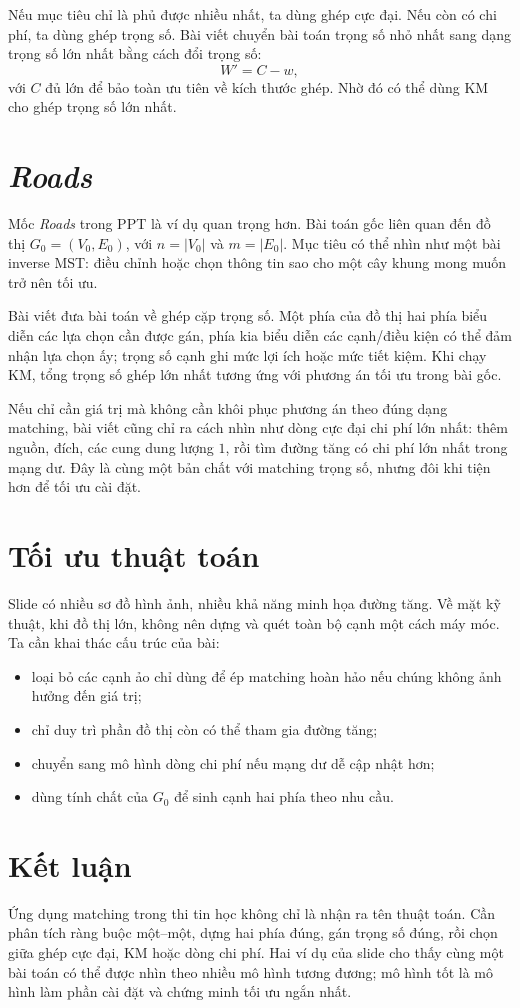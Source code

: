 \documentclass[11pt]{article}
\begin{document}
Nếu mục tiêu chỉ là phủ được nhiều nhất, ta dùng ghép cực đại. Nếu còn có chi
phí, ta dùng ghép trọng số. Bài viết chuyển bài toán trọng số nhỏ nhất sang
dạng trọng số lớn nhất bằng cách đổi trọng số:
\[
  W'=C-w,
\]
với \(C\) đủ lớn để bảo toàn ưu tiên về kích thước ghép. Nhờ đó có thể dùng
KM cho ghép trọng số lớn nhất.

\section{\textit{Roads}}

Mốc \textit{Roads} trong PPT là ví dụ quan trọng hơn. Bài toán gốc liên quan
đến đồ thị \(G_0=(V_0,E_0)\), với \(n=|V_0|\) và \(m=|E_0|\). Mục tiêu có thể
nhìn như một bài inverse MST: điều chỉnh hoặc chọn thông tin sao cho một cây
khung mong muốn trở nên tối ưu.

Bài viết đưa bài toán về ghép cặp trọng số. Một phía của đồ thị hai phía biểu
diễn các lựa chọn cần được gán, phía kia biểu diễn các cạnh/điều kiện có thể
đảm nhận lựa chọn ấy; trọng số cạnh ghi mức lợi ích hoặc mức tiết kiệm. Khi
chạy KM, tổng trọng số ghép lớn nhất tương ứng với phương án tối ưu trong bài
gốc.

Nếu chỉ cần giá trị mà không cần khôi phục phương án theo đúng dạng matching,
bài viết cũng chỉ ra cách nhìn như dòng cực đại chi phí lớn nhất: thêm nguồn,
đích, các cung dung lượng \(1\), rồi tìm đường tăng có chi phí lớn nhất trong
mạng dư. Đây là cùng một bản chất với matching trọng số, nhưng đôi khi tiện
hơn để tối ưu cài đặt.

\section{Tối ưu thuật toán}

Slide có nhiều sơ đồ hình ảnh, nhiều khả năng minh họa đường tăng. Về mặt kỹ
thuật, khi đồ thị lớn, không nên dựng và quét toàn bộ cạnh một cách máy móc.
Ta cần khai thác cấu trúc của bài:
\begin{itemize}
  \item loại bỏ các cạnh ảo chỉ dùng để ép matching hoàn hảo nếu chúng không
  ảnh hưởng đến giá trị;
  \item chỉ duy trì phần đồ thị còn có thể tham gia đường tăng;
  \item chuyển sang mô hình dòng chi phí nếu mạng dư dễ cập nhật hơn;
  \item dùng tính chất của \(G_0\) để sinh cạnh hai phía theo nhu cầu.
\end{itemize}

\section{Kết luận}

Ứng dụng matching trong thi tin học không chỉ là nhận ra tên thuật toán. Cần
phân tích ràng buộc một--một, dựng hai phía đúng, gán trọng số đúng, rồi chọn
giữa ghép cực đại, KM hoặc dòng chi phí. Hai ví dụ của slide cho thấy cùng một
bài toán có thể được nhìn theo nhiều mô hình tương đương; mô hình tốt là mô
hình làm phần cài đặt và chứng minh tối ưu ngắn nhất.
\end{document}
